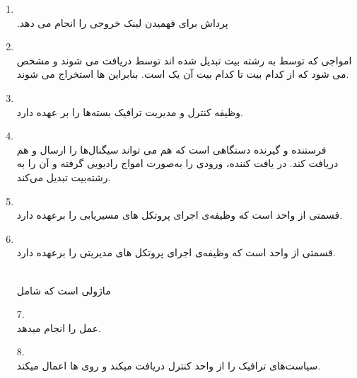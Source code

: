 \begin{qsolve}
	\begin{enumerate}
		\item 
		\\
		‫پرداش‬ ‫برای‬ ‫فهمیدن لینک‬ ‫خروجی‬ ‫را‬ ‫انجام‬ ‫می‬ ‫دهد‪.‬‬
		
		
		\item 
		\\
		امواجی که توسط  به رشته بیت تبدیل شده اند توسط  دریافت می شوند و مشخص می شود که از کدام بیت تا کدام بیت آن یک  است. بنابراین  ها استخراج می شوند.
		
		
		\item 
		\\
		وظیفه کنترل و مدیریت ترافیک بسته‌ها را بر عهده دارد.
		
		
		
		\item 
		\\
		فرستنده و گیرنده دستگاهی است که هم می تواند سیگنال‌ها را ارسال و هم دریافت کند. در یافت کننده، ورودی را به‌صورت امواج رادیویی گرفته و آن را به رشته‌بیت تبدیل می‌کند.
		
		\item 
		\\
		قسمتی از واحد  است که وظیفه‌ی اجرای پروتکل های مسیریابی را برعهده دارد.
		
		\item 
		\\
		قسمتی از واحد  است که وظیفه‌ی اجرای پروتکل های مدیریتی را برعهده دارد.
		
		
		\\
		ماژولی است که شامل 
	\end{enumerate}
	
\end{qsolve}



\begin{qsolve}
	\begin{enumerate}		
		\item [7.]
		\\
		عمل  را انجام می­دهد.
		
		
		\item [8.]
		\\
		سیاست‌­های ترافیک را از واحد کنترل دریافت می­کند و روی  ها اعمال می­کند.
	\end{enumerate}
\end{qsolve}